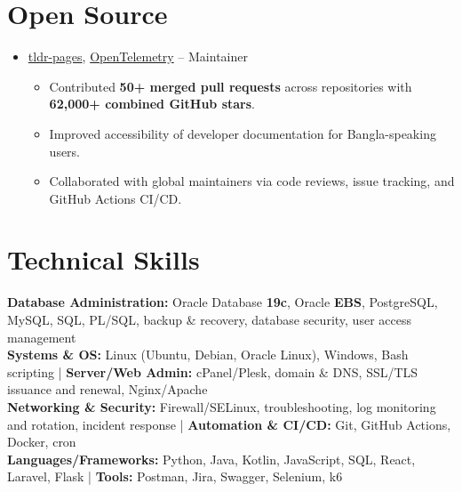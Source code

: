 \documentclass[a4paper]{article}
\begin{document}
\section{Open Source}
\begin{itemize}[leftmargin=0.15in, label={}, parsep=0pt]
\item
\small
\href{https://github.com/tldr-pages/tldr}{tldr-pages}, \href{https://github.com/open-telemetry}{OpenTelemetry} --
Maintainer
\begin{itemize}[noitemsep, topsep=0pt]
    \item Contributed \textbf{50+ merged pull requests} across repositories with \textbf{62,000+ combined GitHub stars}.
    \item Improved accessibility of developer documentation for Bangla-speaking users.
    \item Collaborated with global maintainers via code reviews, issue tracking, and GitHub Actions CI/CD.
\end{itemize}
\end{itemize}




\section{Technical Skills}
\begin{itemize}[leftmargin=0.15in, label={}]
\small{\item{
\textbf{Database Administration:} Oracle Database \textbf{19c}, Oracle \textbf{EBS}, PostgreSQL, MySQL, SQL, PL/SQL, backup \& recovery, database security, user access management\\
\textbf{Systems \& OS:} Linux (Ubuntu, Debian, Oracle Linux), Windows, Bash scripting \;|\;
\textbf{Server/Web Admin:} cPanel/Plesk, domain \& DNS, SSL/TLS issuance and renewal, Nginx/Apache\\
\textbf{Networking \& Security:} Firewall/SELinux, troubleshooting, log monitoring and rotation, incident response \;|\;
\textbf{Automation \& CI/CD:} Git, GitHub Actions, Docker, cron\\
\textbf{Languages/Frameworks:} Python, Java, Kotlin, JavaScript, SQL, React, Laravel, Flask \;|\;
\textbf{Tools:} Postman, Jira, Swagger, Selenium, k6
}}
\end{itemize}




\end{document}
